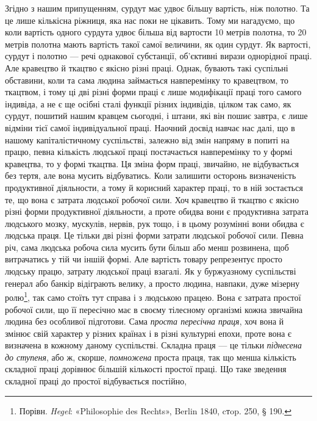 Згідно з нашим припущенням, сурдут має удвоє більшу вартість,
ніж полотно. Та це лише кількісна ріжниця, яка нас поки
не цікавить. Тому ми нагадуємо, що коли вартість одного
сурдута удвоє більша від вартости 10 метрів полотна, то 20 метрів
полотна мають вартість такої самої величини, як один сурдут. Як
вартості, сурдут і полотно — речі однакової субстанції, об’єктивні
вирази однорідної праці. Але кравецтво й ткацтво є якісно
різні праці. Однак, бувають такі суспільні обставини, коли та
сама людина займається навперемінку то кравецтвом, то ткацтвом,
і тому ці дві різні форми праці є лише модифікації праці
того самого індивіда, а не є ще осібні сталі функції різних індивідів,
цілком так само, як сурдут, пошитий нашим кравцем сьогодні,
і штани, які він пошиє завтра, є лише відміни тієї самої
індивідуальної праці. Наочний досвід навчає нас далі, що в нашому
капіталістичному суспільстві, залежно від змін напряму
в попиті на працю, певна кількість людської праці постачається
навперемінку то у формі кравецтва, то у формі ткацтва. Ця зміна
форм праці, звичайно, не відбувається без тертя, але вона мусить
відбуватись. Коли залишити осторонь визначеність продуктивної
діяльности, а тому й корисний характер праці, то в ній зостається
те, що вона є затрата людської робочої сили. Хоч кравецтво й
ткацтво є якісно різні форми продуктивної діяльности, а проте
обидва вони є продуктивна затрата людського мозку, мускулів,
нервів, рук тощо, і в цьому розумінні вони обидва є людська праця.
Це тільки дві різні форми затрати людської робочої сили. Певна
річ, сама людська робоча сила мусить бути більш або менш розвинена,
щоб витрачатись у тій чи іншій формі. Але вартість товару
репрезентує просто людську працю, затрату людської праці
взагалі. Як у буржуазному суспільстві генерал або банкір відіграють
велику, а просто людина, навпаки, дуже мізерну ролю\footnote{
Порівн. \emph{Hegel}: «Philosophie des Rechts», Berlin 1840, cтop. 250,
§ 190.
},
так само стоїть тут справа і з людською працею. Вона є затрата
простої робочої сили, що її пересічно має в своєму тілесному
організмі кожна звичайна людина без особливої підготови. Сама
\emph{проста пересічна праця}, хоч вона й змінює свій характер у різних
країнах і в різні культурні епохи, проте вона є визначена в кожному
даному суспільстві. Складна праця — це тільки \emph{піднесена
до ступеня}, або ж, скорше, \emph{помножена} проста праця, так що менша
кількість складної праці дорівнює більшій кількості простої праці.
Що таке зведення складної праці до простої відбувається постійно,
